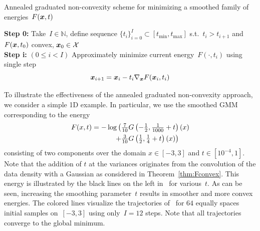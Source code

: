 \documentclass[nohyperref]{article}
\newcommand{\N}{\mathbb{N}}
\newcommand{\X}{\mathcal{X}}
\newcommand{\tmin}{t_\mathrm{min}}
\newcommand{\tmax}{t_\mathrm{max}}
\theoremstyle{plain}
\theoremstyle{definition}
\theoremstyle{remark}
\begin{document}
\begin{algorithm}[t]
\caption{Annealed graduated non-convexity scheme for minimizing a smoothed family of energies~$F({\bm{x}},t)$}\label{alg:graduatedNC}
\textbf{Step 0:} Take~$I\in\N$, define sequence $\{t_i\}_{i=0}^I\subset[\tmin,\tmax]$ s.t.~$t_{i}>t_{i+1}$ and~$F({\bm{x}},t_0)$ convex, $\vx_0\in\X$ \\
\textbf{Step i:} $(0\leq i< I)$ 
Approximately minimize current energy~$F(\cdot,t_i)$ using single step
\[
{\bm{x}}_{i+1}={\bm{x}}_i-t_i \nabla_{\bm{x}} F({\bm{x}}_i,t_i)
\] 
\end{algorithm}

To illustrate the effectiveness of the annealed graduated non-convexity approach, we consider a simple 1D example.
In particular, we use the smoothed GMM corresponding to the energy
\begin{align} \label{eq:gmmEx}
F(x,t)=-\log\big(\tfrac{7}{10}&G\left(-\tfrac12,\tfrac{1}{1000}+t\right)(x)\\
+\tfrac{3}{10}&G\left(\tfrac12,\tfrac14+t\right)(x)\big) \notag
\end{align}
consisting of two components over the domain $x\in[-3,3]$ and $t\in[10^{-4},1]$.
Note that the addition of $t$ at the variances originates from the convolution of the data density with a Gaussian as considered in Theorem~\ref{thm:Fconvex}.
This energy is illustrated by the black lines on the left in~ for various~$t$.
As can be seen, increasing the smoothing parameter~$t$ results in smoother and more convex energies.
The colored lines visualize the trajectories of~ for $64$ equally spaces initial samples on~$[-3,3]$ using only~$I=12$ steps.
Note that all trajectories converge to the global minimum.
\end{document}
